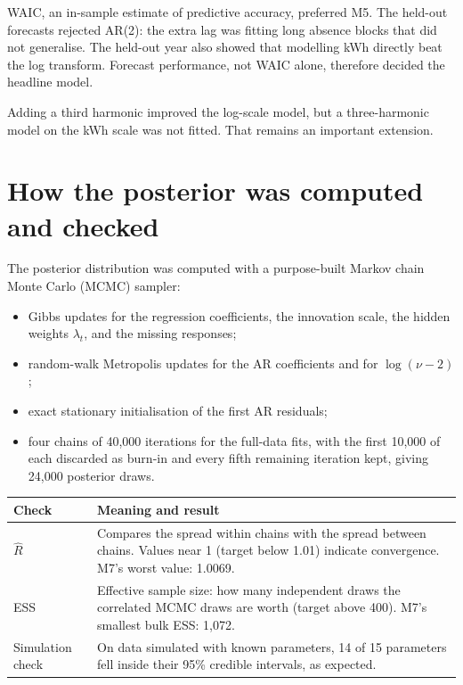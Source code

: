\documentclass[11pt]{article}
\makeatletter
\newenvironment{reftable}[3]
  {\par\nopagebreak\addvspace{4pt}\noindent
   \renewcommand{\arraystretch}{1.3}%
   \begin{tabular}{@{}>{\raggedright\arraybackslash}p{#1\textwidth}
                      >{\raggedright\arraybackslash}p{\dimexpr0.97\textwidth-#1\textwidth-2\tabcolsep\relax}@{}}
   \toprule \textbf{#2} & \textbf{#3} \\ \midrule}
  {\bottomrule\end{tabular}\par\addvspace{8pt}}
\makeatother
\begin{document}
WAIC, an in-sample estimate of predictive accuracy, preferred M5. The held-out
forecasts rejected AR(2): the extra lag was fitting long absence blocks that did
not generalise. The held-out year also showed that modelling kWh directly beat
the log transform. Forecast performance, not WAIC alone, therefore decided the
headline model.

Adding a third harmonic improved the log-scale model, but a three-harmonic
model on the kWh scale was not fitted. That remains an important extension.

\section{How the posterior was computed and checked}

The posterior distribution was computed with a purpose-built Markov chain Monte
Carlo (MCMC) sampler:
\begin{itemize}[leftmargin=*]
\item Gibbs updates for the regression coefficients, the innovation scale, the
  hidden weights $\lambda_t$, and the missing responses;
\item random-walk Metropolis updates for the AR coefficients and for
  $\log(\nu - 2)$;
\item exact stationary initialisation of the first AR residuals;
\item four chains of 40,000 iterations for the full-data fits, with the first
  10,000 of each discarded as burn-in and every fifth remaining iteration kept,
  giving 24,000 posterior draws.
\end{itemize}

\begin{reftable}{0.2}{Check}{Meaning and result}
$\widehat R$ & Compares the spread within chains with the spread between chains. Values near 1 (target below 1.01) indicate convergence. M7's worst value: 1.0069. \\
ESS & Effective sample size: how many independent draws the correlated MCMC draws are worth (target above 400). M7's smallest bulk ESS: 1,072. \\
Simulation check & On data simulated with known parameters, 14 of 15 parameters fell inside their 95\% credible intervals, as expected. \\
\end{reftable}

\end{document}
